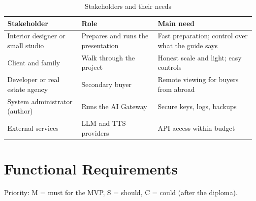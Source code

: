 \begin{table}[H]
\centering
\begin{tightblock}
\begin{tabularx}{\textwidth}{P{4.2cm} P{3.6cm} L}
\toprule
\textbf{Stakeholder} & \textbf{Role} & \textbf{Main need} \\
\midrule
Interior designer or small studio & Prepares and runs the presentation & Fast preparation; control over what the guide says \\
Client and family & Walk through the project & Honest scale and light; easy controls \\
Developer or real estate agency & Secondary buyer & Remote viewing for buyers from abroad \\
System administrator (author) & Runs the AI Gateway & Secure keys, logs, backups \\
External services & LLM and TTS providers & API access within budget \\
\bottomrule
\end{tabularx}
\end{tightblock}
\caption{Stakeholders and their needs}
\label{tab:stakeholders}
\end{table}

\section{Functional Requirements}

Priority: M = must for the MVP, S = should, C = could (after the diploma).

